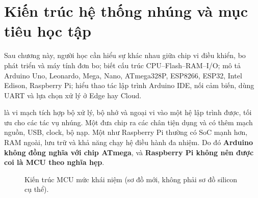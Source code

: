 
\section{Kiến trúc hệ thống nhúng và mục tiêu học tập}
Sau chương này, người học cần hiểu sự khác nhau giữa chip vi điều khiển, bo phát triển và máy tính đơn bo; biết cấu trúc CPU--Flash--RAM--I/O; mô tả Arduino Uno, Leonardo, Mega, Nano, ATmega328P, ESP8266, ESP32, Intel Edison, Raspberry Pi; hiểu thao tác lập trình Arduino IDE, nối cảm biến, dùng UART và lựa chọn xử lý ở Edge hay Cloud.

 là vi mạch tích hợp bộ xử lý, bộ nhớ và ngoại vi vào một hệ lập trình được, tối ưu cho các tác vụ nhúng. Một  đưa chip ra các chân tiện dụng và có thêm mạch nguồn, USB, clock, bộ nạp. Một  như Raspberry Pi thường có SoC mạnh hơn, RAM ngoài, lưu trữ và khả năng chạy hệ điều hành đa nhiệm. Do đó \textbf{Arduino không đồng nghĩa với chip ATmega}, và \textbf{Raspberry Pi không nên được coi là MCU theo nghĩa hẹp}.

\begin{figure}[htbp]\centering
{}
\caption{Kiến trúc MCU mức khái niệm (sơ đồ mới, không phải sơ đồ silicon cụ thể).}
\end{figure}

